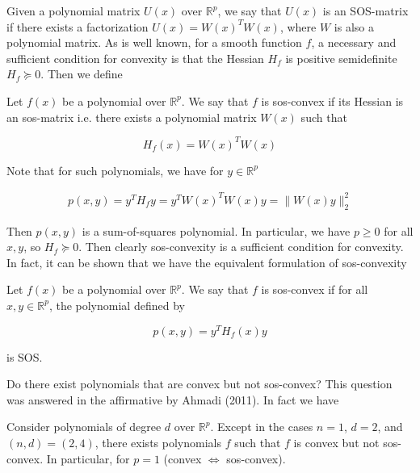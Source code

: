 \documentclass[11pt,reqno]{amsart}
\numberwithin{equation}{section}
\newcommand{\mr}{\mathbb{R}}
\begin{document}
Given a polynomial matrix $U(x)$ over $\mr^p$, we say that $U(x)$ is an SOS-matrix if there exists a factorization $U(x) = W(x)^TW(x)$, where $W$ is also a polynomial matrix. As is well known, for a smooth function $f$, a necessary and sufficient condition for convexity is that the Hessian $H_f$ is positive semidefinite $H_f \succeq 0$. Then we define \\

\begin{definition} Let $f(x)$ be a polynomial over $\mr^p$. We say that $f$ is sos-convex if its Hessian is an sos-matrix i.e. there exists a polynomial matrix $W(x)$ such that 

\[
H_f(x) = W(x)^TW(x)
\]

\end{definition} 

Note that for such polynomials, we have for $y \in \mr^p $ 

\begin{align*}
p(x,y) = y^T H_f y = y^T W(x)^T W(x) y = \|W(x) y\|_2^2 
\end{align*}

Then $p(x,y)$ is a sum-of-squares polynomial. In particular, we have $p \geq 0$ for all $x, y$, so $H_f \succeq 0$. Then clearly sos-convexity is a sufficient condition for convexity. In fact, it can be shown that we have the equivalent formulation of sos-convexity\\

\begin{definition} Let $f(x)$ be a polynomial over $\mr^p$. We say that $f$ is sos-convex if for all $x, y \in \mr^p$, the polynomial defined by 

\[
p(x,y) = y^TH_f(x)y
\]

is SOS. \\

\end{definition}

Do there exist polynomials that are convex but not sos-convex? This question was answered in the affirmative by Ahmadi (2011). In fact we have \\

\begin{theorem}[Ahmadi (2011)] Consider polynomials of degree $d$ over $\mr^p$. Except in the cases $n = 1$, $d = 2$, and $(n,d) = (2,4)$, there exists polynomials $f$ such that $f$ is convex but not sos-convex. In particular, for $p = 1$ (convex $\iff$ sos-convex). \\

\end{theorem}
\end{document}
